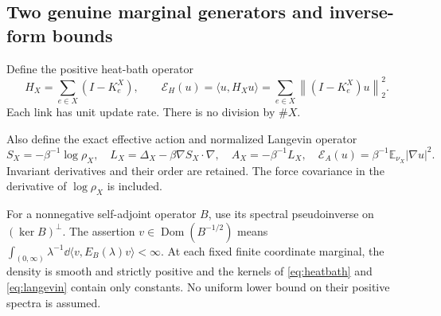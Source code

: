 \documentclass[11pt,letterpaper]{article}
\theoremstyle{remark}\newtheorem{remark}[theorem]{Remark}
\newcommand{\E}{\mathbb E}
\newcommand{\norm}[1]{\left\lVert#1\right\rVert}
\newcommand{\cE}{\mathcal E}
\begin{document}
\subsection{Two genuine marginal generators and inverse-form bounds}

Define the positive heat-bath operator
\begin{equation}\label{eq:heatbath}
 H_X=\sum_{e\in X}(I-K_e^X),\qquad
 \cE_H(u)=\langle u,H_Xu\rangle
 =\sum_{e\in X}\norm{(I-K_e^X)u}_2^2.
\end{equation}
Each link has unit update rate. There is no division by $\#X$.

Also define the exact effective action and normalized Langevin operator
\begin{equation}\label{eq:langevin}
 S_X=-\beta^{-1}\log\rho_X,\quad
 L_X=\Delta_X-\beta\nabla S_X\cdot\nabla,\quad
 A_X=-\beta^{-1}L_X,\quad
 \cE_A(u)=\beta^{-1}\E_{\nu_X}|\nabla u|^2.
\end{equation}
Invariant derivatives and their order are retained. The force covariance in the derivative of $\log\rho_X$ is included.

For a nonnegative self-adjoint operator $B$, use its spectral pseudoinverse on $(\ker B)^\perp$. The assertion $v\in\operatorname{Dom}(B^{-1/2})$ means
$\int_{(0,\infty)}\lambda^{-1}\dd\langle v,E_B(\lambda)v\rangle<\infty$.
At each fixed finite coordinate marginal, the density is smooth and strictly positive and the kernels of \eqref{eq:heatbath} and \eqref{eq:langevin} contain only constants. No uniform lower bound on their positive spectra is assumed.
\end{document}
